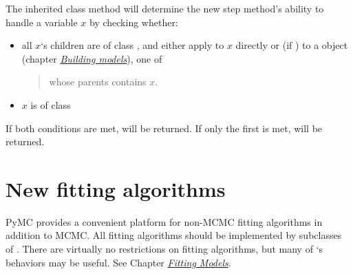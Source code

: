\documentclass[letterpaper,10pt,english]{sphinxmanual}
\begin{document}
The inherited class method  will determine the new step method's ability to handle a variable $x$ by checking whether:
\begin{itemize}
\item {} 
all $x$`s children are of class , and either apply
 to $x$ directly or (if ) to a
 object (chapter {\hyperref[modelbuilding:chap-modelbuilding]{\emph{Building models}}}), one of
\begin{quote}

whose parents contains $x$.
\end{quote}

\item {} 
$x$ is of class 

\end{itemize}

If both conditions are met,  will be returned. If only the first is met,  will be returned.


\section{New fitting algorithms}
\label{extending:custom-model}\label{extending:new-fitting-algorithms}
PyMC provides a convenient platform for non-MCMC fitting algorithms in addition to MCMC. All fitting algorithms should be implemented by subclasses of . There are virtually no restrictions on fitting algorithms, but many of `s behaviors may be useful. See Chapter {\hyperref[modelfitting:chap-modelfitting]{\emph{Fitting Models}}}.
\end{document}
